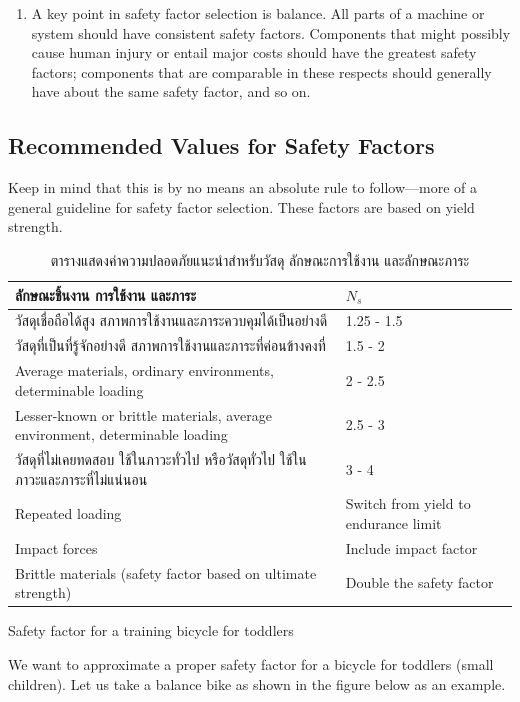 \documentclass[a4paper,openany,12pt]{book}
\begin{document}
\begin{enumerate}
\item A key point in safety factor selection is balance. All parts of a
machine or system should have consistent safety factors. Components
that might possibly cause human injury or entail major costs should
have the greatest safety factors; components that are comparable in
these respects should generally have about the same safety factor,
and so on.
\end{enumerate}

\subsection{Recommended Values for Safety Factors}
\label{recommended-values-for-safety-factors}
Keep in mind that this is by no means an absolute rule to follow---more
of a general guideline for safety factor selection. These factors are
based on yield strength.

\begin{table}[htbp]
\caption{\label{table: safety factor guideline}
ตารางแสดงค่าความปลอดภัยแนะนำสำหรับวัสดุ ลักษณะการใช้งาน และลักษณะภาระ}
\centering
\begin{tabular}{ll}
\toprule
ลักษณะชิ้นงาน การใช้งาน และภาระ & \(N_s\)\\
\midrule
วัสดุเชื่อถือได้สูง สภาพการใช้งานและภาระควบคุมได้เป็นอย่างดี & 1.25 - 1.5\\
วัสดุที่เป็นที่รู้จักอย่างดี สภาพการใช้งานและภาระที่ค่อนข้างคงที่ & 1.5 - 2\\
Average materials, ordinary environments, determinable loading & 2 - 2.5\\
Lesser-known or brittle materials, average environment, determinable loading & 2.5 - 3\\
วัสดุที่ไม่เคยทดสอบ ใช้ในภาวะทั่วไป หรือวัสดุทั่วไป ใช้ในภาวะและภาระที่ไม่แน่นอน & 3 - 4\\
Repeated loading & Switch from yield to endurance limit\\
Impact forces & Include impact factor\\
Brittle materials (safety factor based on ultimate strength) & Double the safety factor\\
\bottomrule
\end{tabular}
\end{table}

Safety factor for a training bicycle for toddlers

We want to approximate a proper safety factor for a bicycle for toddlers
(small children). Let us take a balance bike as shown in the figure
below as an example.
\end{document}
